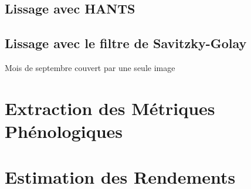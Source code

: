 \subsection{Lissage avec HANTS}

\subsection{Lissage avec le filtre de Savitzky-Golay}

Mois de septembre couvert par une seule image

\section{Extraction des Métriques Phénologiques}

\section{Estimation des Rendements}